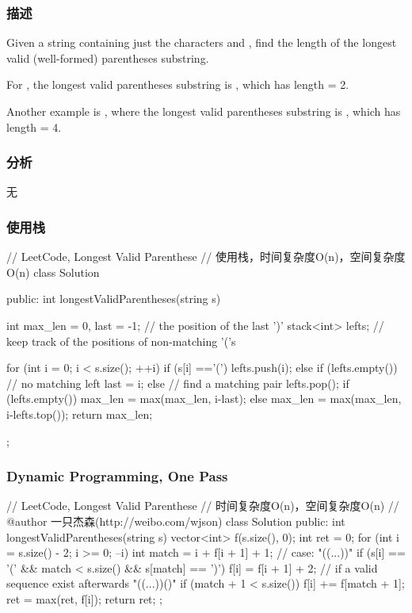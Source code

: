 \subsubsection{描述}
Given a string containing just the characters  and , find the length of the longest valid (well-formed) parentheses substring.

For , the longest valid parentheses substring is , which has length = 2.

Another example is , where the longest valid parentheses substring is , which has length = 4.


\subsubsection{分析}
无


\subsubsection{使用栈}
\begin{Code}
	// LeetCode, Longest Valid Parenthese
	// 使用栈，时间复杂度O(n)，空间复杂度O(n)
	class Solution {
		public:
		int longestValidParentheses(string s) {
			int max_len = 0, last = -1; // the position of the last ')'
			stack<int> lefts;  // keep track of the positions of non-matching '('s
			
			for (int i = 0; i < s.size(); ++i) {
				if (s[i] =='(') {
					lefts.push(i);
				} else {
				if (lefts.empty()) {
					// no matching left
					last = i;
				} else {
				// find a matching pair
				lefts.pop();
				if (lefts.empty()) {
					max_len = max(max_len, i-last);
				} else {
				max_len = max(max_len, i-lefts.top());
			}
		}
	}
}
return max_len;
}
};
\end{Code}

\subsubsection{Dynamic Programming, One Pass}
\begin{Code}
	// LeetCode, Longest Valid Parenthese
	// 时间复杂度O(n)，空间复杂度O(n)
	// @author 一只杰森(http://weibo.com/wjson)
	class Solution {
		public:
		int longestValidParentheses(string s) {
			vector<int> f(s.size(), 0);
			int ret = 0;
			for (int i = s.size() - 2; i >= 0; --i) {
				int match = i + f[i + 1] + 1;
				// case: "((...))"
				if (s[i] == '(' && match < s.size() && s[match] == ')') {
					f[i] = f[i + 1] + 2;
					// if a valid sequence exist afterwards "((...))()"
					if (match + 1 < s.size()) f[i] += f[match + 1];
				}
				ret = max(ret, f[i]);
			}
			return ret;
		}
	};
\end{Code}


